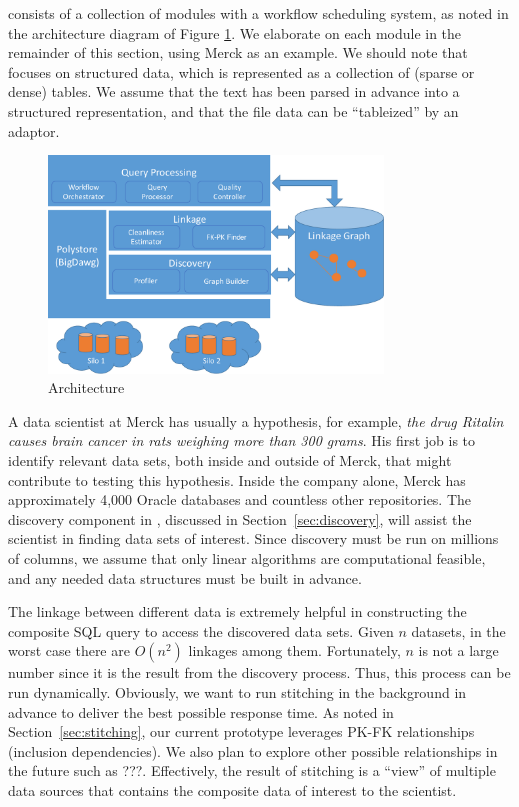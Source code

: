 \dcv consists of a collection of modules with a workflow scheduling system, as noted in the architecture diagram of Figure \ref{fig:arch}. We elaborate on each module in the remainder of this section, using Merck as an example.
We should note that \dcv focuses on structured data, which is represented as a collection of (sparse or dense) tables.
We assume that the text has been parsed in advance into a structured representation, and that the file data can be “tableized” by an adaptor.




\begin{figure}[!t]
\includegraphics[width=3.5in]{arch3.pdf}
\caption{\dcv Architecture}
\label{fig:arch}
\end{figure}


\stitle{[Discovery]} A data scientist at Merck has usually a hypothesis, for example, {\it the drug Ritalin causes brain cancer in rats weighing more than 300 grams}.
His first job is to identify relevant data sets, both inside and outside of Merck, that might contribute to testing this hypothesis. Inside the company alone, Merck has approximately 4,000 Oracle databases and countless other repositories. The discovery component in \dcv, discussed in Section~\ref{sec:discovery}, will assist the scientist in finding data sets of interest.  Since discovery must be run on millions of columns, we assume that only linear algorithms are computational feasible, and any needed data structures must be built in advance.


\stitle{[Stitching]} The linkage between different data is extremely helpful in constructing the composite \textsf{SQL} query to access the discovered data sets.
Given $n$ datasets, in the worst case there are $O(n^2)$ linkages among them.
Fortunately, $n$ is not a large number since it is the result from the discovery process. Thus, this process can be run dynamically. Obviously, we want to run stitching in the background in advance to deliver the best possible response time. As noted in Section~\ref{sec:stitching}, our current prototype leverages PK-FK relationships (inclusion dependencies).
We also plan to explore other possible relationships in the future such as ???.
Effectively, the result of stitching is a ``view'' of multiple data sources that contains the composite data of interest to the scientist.


